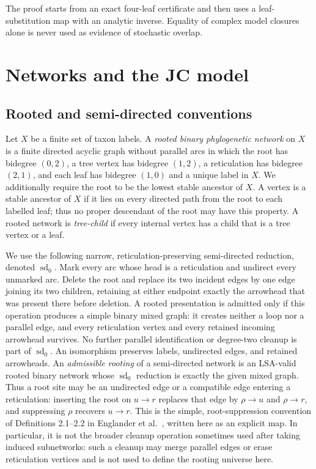 \documentclass[11pt]{article}
\theoremstyle{remark}
\begin{document}
The proof starts from an exact four-leaf certificate and then uses a
leaf-substitution map with an analytic inverse.  Equality of complex model
closures alone is never used as evidence of stochastic overlap.

\section{Networks and the JC model}

\subsection{Rooted and semi-directed conventions}

Let $X$ be a finite set of taxon labels.  A \emph{rooted binary
phylogenetic network} on $X$ is a finite directed acyclic graph without
parallel arcs in which the root has bidegree $(0,2)$, a tree vertex has
bidegree $(1,2)$, a reticulation has bidegree $(2,1)$, and each leaf has
bidegree $(1,0)$ and a unique label in $X$.  We additionally require the
root to be the lowest stable ancestor of $X$.  A vertex is a stable ancestor
of $X$ if it lies on every directed path from the root to each labelled leaf;
thus no proper descendant of the root may have this property.  A rooted
network is
\emph{tree-child} if every internal vertex has a child that is a tree vertex
or a leaf.

We use the following narrow, reticulation-preserving semi-directed reduction,
denoted $\operatorname{sd}_0$.  Mark every arc whose head is a
reticulation and undirect every unmarked arc.  Delete the root and replace its
two incident edges by one edge joining its two children, retaining at either
endpoint exactly the arrowhead that was present there before deletion.  A
rooted presentation is admitted only if this operation produces a simple
binary mixed graph: it creates neither a loop nor a parallel edge, and every
reticulation vertex and every retained incoming arrowhead survives.  No
further parallel identification or degree-two cleanup is part of
$\operatorname{sd}_0$.  An isomorphism preserves labels, undirected edges,
and retained arrowheads.  An \emph{admissible rooting} of a semi-directed
network is an LSA-valid rooted binary network whose $\operatorname{sd}_0$
reduction is exactly the given mixed graph.
Thus a root site may be an undirected edge or a compatible edge entering a
reticulation: inserting the root on $u\to r$ replaces that edge by
$\rho\to u$ and $\rho\to r$, and suppressing $\rho$ recovers $u\to r$.
This is the simple, root-suppression convention of Definitions 2.1--2.2 in
Englander et al.~\cite{EnglanderEtAl2026}, written here as an explicit map.
In particular, it is not the broader cleanup operation sometimes used after
taking induced subnetworks: such a cleanup may merge parallel edges or erase
reticulation vertices and is not used to define the rooting universe here.
\end{document}
